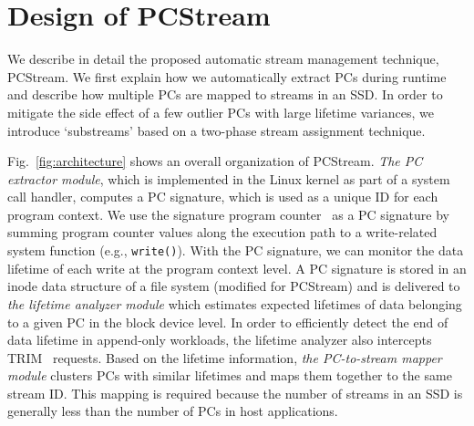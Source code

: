 \vspace{-10pt}
\section{Design of \textsf{PCStream}}
\vspace{-8pt}
We describe in detail the proposed automatic stream management technique, 
\textsf{\small PCStream}.  We first explain how we automatically extract PCs during
runtime and describe how multiple PCs are mapped to streams in an SSD.
In order to mitigate the side effect of a few outlier PCs with large lifetime variances, 
we introduce `substreams' based on a two-phase
stream assignment technique.


Fig.~\ref{fig:architecture} shows an overall organization of \textsf{\small PCStream}.
\textit{The PC extractor module}, which is implemented in the Linux kernel as
part of a system call handler, 
computes a PC signature, which is used as a unique ID for each program context.  
We use the signature program counter~\cite{PC} as a PC signature 
by summing program counter values along the execution path to a write-related system function 
(e.g., {\tt write()}).  
With the PC signature, we can monitor the data lifetime of each write at the program context level. 
A PC signature is stored
in an inode data structure of a file system (modified for \textsf{\small PCStream})
and is delivered to \textit{the lifetime analyzer module} which estimates
expected lifetimes of data belonging to a given PC in the block device level.
In order to efficiently detect the end of data lifetime in append-only
workloads, the lifetime analyzer also intercepts TRIM~\cite{TRIM} requests. %
Based on the lifetime information, \textit{the PC-to-stream
mapper module} clusters PCs with similar lifetimes and maps them together to
the same stream ID.  This mapping is required because 
the number of streams in an SSD is generally less than the number of PCs in host applications.

\vspace{-13pt}

